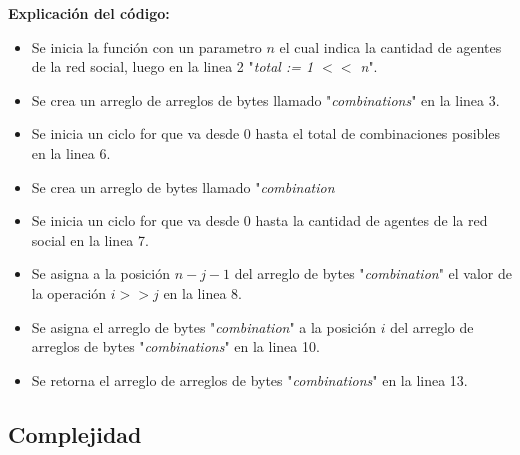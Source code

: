 \documentclass[letterpaper,10pt]{article}
\begin{document}
\textbf{Explicación del código:}
\begin{itemize}
  \item Se inicia la función con un parametro $n$ el cual indica la cantidad de agentes de la red social, luego en la linea 2 "\textit{total := 1 $<<$ n}".
  \item Se crea un arreglo de arreglos de bytes llamado "\textit{combinations}" en la linea 3.
  \item Se inicia un ciclo for que va desde 0 hasta el total de combinaciones posibles en la linea 6.
  \item Se crea un arreglo de bytes llamado "\textit{combination}
  \item Se inicia un ciclo for que va desde 0 hasta la cantidad de agentes de la red social en la linea 7.
  \item Se asigna a la posición $n-j-1$ del arreglo de bytes "\textit{combination}" el valor de la operación $i >> j$ en la linea 8.
  \item Se asigna el arreglo de bytes "\textit{combination}" a la posición $i$ del arreglo de arreglos de bytes "\textit{combinations}" en la linea 10.
  \item Se retorna el arreglo de arreglos de bytes "\textit{combinations}" en la linea 13.
\end{itemize}

\subsection{Complejidad}
\label{subsec:complejidad_fuerza_bruta}
\end{document}
